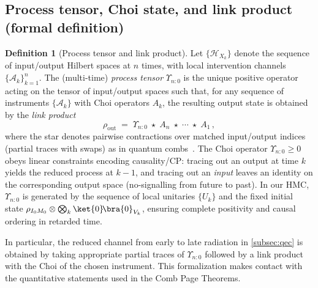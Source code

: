\documentclass[aps,prd,preprint,onecolumn,superscriptaddress,nofootinbib,longbibliography,floatfix,11pt,showpacs,showkeys]{revtex4-2}
\newcommand{\HMC}{\textsc{HMC}\xspace}
\theoremstyle{plain}
\theoremstyle{definition}
\newtheorem{definition}[theorem]{Definition}
\theoremstyle{remark}
\begin{document}
\subsection{Process tensor, Choi state, and link product (formal definition)}
\label{subsec:process-tensor-def}
\begin{definition}[Process tensor and link product]
Let $\{\mathcal{H}_{X_k}\}$ denote the sequence of input/output Hilbert spaces at $n$ times, with local intervention channels $\{\mathcal{A}_k\}_{k=1}^n$. The (multi-time) \emph{process tensor} $\Upsilon_{n{:}0}$ is the unique positive operator acting on the tensor of input/output spaces such that, for any sequence of instruments $\{\mathcal{A}_k\}$ with Choi operators $A_k$, the resulting output state is obtained by the \emph{link product}
\begin{equation}
\rho_{\mathrm{out}} \;=\; \Upsilon_{n{:}0} \;\star\; A_n \;\star\; \cdots \;\star\; A_1 \,,
\end{equation}
where the star denotes pairwise contractions over matched input/output indices (partial traces with swaps) as in quantum combs~\cite{Chiribella:2009}. The Choi operator $\Upsilon_{n{:}0}\ge 0$ obeys linear constraints encoding causality/CP: tracing out an output at time $k$ yields the reduced process at $k{-}1$, and tracing out an \emph{input} leaves an identity on the corresponding output space (no-signalling from future to past). In our \HMC{}, $\Upsilon_{n{:}0}$ is generated by the sequence of local unitaries $\{U_k\}$ and the fixed initial state $\rho_{I_0M_0}\otimes\bigotimes_k \ket{0}\!\bra{0}_{V_k}$, ensuring complete positivity and causal ordering in retarded time.
\end{definition}
In particular, the reduced channel from early to late radiation in \cref{subsec:qec} is obtained by taking appropriate partial traces of $\Upsilon_{n{:}0}$ followed by a link product with the Choi of the chosen instrument. This formalization makes contact with the quantitative statements used in the Comb Page Theorems.
\end{document}
